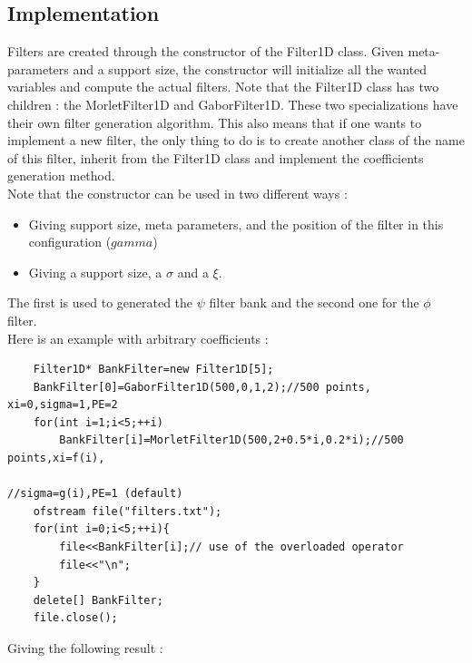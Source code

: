 \documentclass[a4paper]{report}
\begin{document}
\subsection{Implementation}
Filters are created through the constructor of the Filter1D class. Given meta-parameters and a support size, the constructor will initialize all the wanted variables and compute the actual filters. Note that the Filter1D class has two children : the MorletFilter1D and GaborFilter1D. These two specializations have their own filter generation algorithm. This also means that if one wants to implement a new filter, the only thing to do is to create another class of the name of this filter, inherit from the Filter1D class and implement the coefficients generation method.
\\Note that the constructor can be used in two different ways :
\begin{itemize}
\item Giving support size, meta parameters, and the position of the filter in this configuration ($gamma$)
\item Giving a support size, a $\sigma$ and a $\xi$.
\end{itemize}
The first is used to generated the $\psi$ filter bank and the second one for the $\phi$ filter.
\\
Here is an example with arbitrary coefficients :
\begin{lstlisting}
    Filter1D* BankFilter=new Filter1D[5];
    BankFilter[0]=GaborFilter1D(500,0,1,2);//500 points, xi=0,sigma=1,PE=2
    for(int i=1;i<5;++i)
        BankFilter[i]=MorletFilter1D(500,2+0.5*i,0.2*i);//500 points,xi=f(i),
                                                        //sigma=g(i),PE=1 (default)
    ofstream file("filters.txt");
    for(int i=0;i<5;++i){
        file<<BankFilter[i];// use of the overloaded operator
        file<<"\n";
    }
    delete[] BankFilter;
    file.close();

\end{lstlisting}
Giving the following result :
\end{document}
